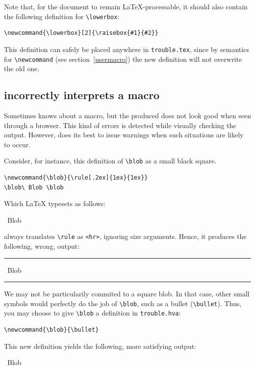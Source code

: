 Note that, for the document to remain \LaTeX{}-processable,
it should also contain the following definition for
\verb+\lowerbox+:
\begin{verbatim}
\newcommand{\lowerbox}[2]{\raisebox{#1}{#2}}
\end{verbatim}
This definition can safely be placed anywhere in \texttt{trouble.tex},
since by \hevea{} semantics for \verb+\newcommand+ (see
section~\ref{usermacro})
the new definition will not overwrite the old one.

\subsection{\hevea{} incorrectly interprets a macro}\label{blob}

Sometimes \hevea{} knows about a macro, but the produced \html{}
does not look good when seen through a browser.
This kind of errors is detected while visually checking the
output.
However, \hevea{} does its best to issue warnings when such situations
are likely to occur.

Consider, for instance, this definition of \verb+\blob+ as a small
black square.
\begin{verbatim}
\newcommand{\blob}{\rule[.2ex]{1ex}{1ex}}
\blob\ Blob \blob
\end{verbatim}
Which \LaTeX{} typesets as follows:
\begin{latexout}
\begingroup\newcommand{\blob}{\rule[.2ex]{1ex}{1ex}}
\blob\ Blob \blob
\endgroup
\end{latexout}
\hevea{} always translates \verb+\rule+ as \verb+<hr>+, ignoring size
arguments.
Hence, it produces the following, wrong, output:
\begin{htmlout}\newcommand{\blob}{\rule[.2ex]{1ex}{1ex}}
\begin{htmlonly}
\blob\ Blob \blob
\end{htmlonly}
\begin{latexonly}\vspace*{.5ex}
%
\end{latexonly}%
\end{htmlout}

We may not be particularily commited to a square blob.
In that case, other small symbols would perfectly do the job
of \verb+\blob+, such as a bullet (\verb+\bullet+).
Thus, you may choose to give \verb+\blob+ a definition in
\verb+trouble.hva+:
\begin{verbatim}
\newcommand{\blob}{\bullet}
\end{verbatim}
This new definition yields the following, more satisfying output:
\begin{htmlout}\newcommand{\blob}{\bullet}%
\begin{htmlonly}%
\blob\ Blob \blob
\end{htmlonly}
\begin{latexonly}\vspace*{.5ex}
%
\end{latexonly}%
\end{htmlout}

